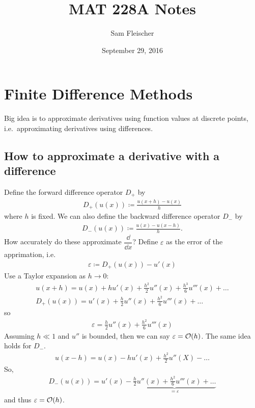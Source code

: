 \documentclass{article}
\title{MAT 228A Notes}
\author{Sam Fleischer}
\date{September 29, 2016}
\newcommand{\E}{\varepsilon}
\begin{document}
    \maketitle

    \section{Finite Difference Methods}
        Big idea is to approximate derivatives using function values at discrete points, i.e.~approximating derivatives using differences.

        \subsection{How to approximate a derivative with a difference}
            Define the forward difference operator $D_+$ by
            \begin{align*}
                D_+(u(x)) \coloneqq \frac{u(x + h) - u(x)}{h}
            \end{align*}
            where $h$ is fixed.  We can also define the backward difference operator $D_-$ by
            \begin{align*}
                D_-(u(x)) \coloneqq \frac{u(x) - u(x - h)}{h}.
            \end{align*}
            How accurately do these approximate $\dfrac{\dd}{\dd x}$?  Define $\E$ as the error of the apprimation, i.e.
            \begin{align*}
                \E \coloneqq D_+(u(x)) - u'(x)
            \end{align*}
            Use a Taylor expansion as $h \rightarrow 0$:
            \begin{align*}
                u(x+h) = u(x) + h u'(x) + \frac{h^2}{2}u''(x) + \frac{h^3}{6}u'''(x) + \dots \\
                D_+(u(x)) = u'(x) + \frac{h}{2}u''(x) + \frac{h^2}{6}u'''(x) + \dots
            \end{align*}
            so
            \begin{align*}
                \E = \frac{h}{2}u''(x) + \frac{h^2}{6}u'''(x)
            \end{align*}
            Assuming $h \ll 1$ and $u''$ is bounded, then we can say $\E = \order{h}$.  The same idea holds for $D_-$.
            \begin{align*}
                u(x - h) = u(x) - hu'(x) + \frac{h^2}{2}u''(X) - \dots
            \end{align*}
            So,
            \begin{align*}
                D_-(u(x)) = u'(x) - \underbrace{\frac{h}{2}u''(x) + \frac{h^2}{6}u'''(x) + \dots}_{=\E}
            \end{align*}
            and thus $\E = \order{h}$.
\end{document}
